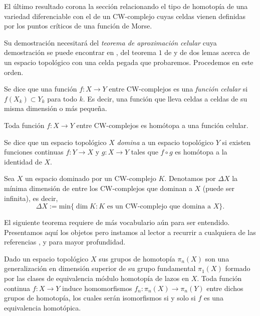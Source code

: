 El último resultado corona la sección relacionando el tipo de homotopía de una variedad diferenciable con el de un CW-complejo cuyas celdas vienen definidas por los puntos críticos de una función de Morse. 

Su demostración necesitará del \textit{teorema de aproximación celular} cuya demostración se puede encontrar en \cite[p.~349]{hatcher2002}, del teorema $1$ de \cite{Whitehead1949CombinatorialHomotopy} y de dos lemas acerca de un espacio topológico con una celda pegada que probaremos. Procedemos en este orden.
\vspace{0.5em}

\begin{definition}
    Se dice que una función $f:X\to Y$ entre CW-complejos es una \textit{función celular} si $f(X_k)\subset Y_k$ para todo $k$. Es decir, una función que lleva celdas a celdas de su misma dimensión o más pequeña.
\end{definition}
\begin{theorem}
\label{aprox_celular}
    Toda función $f:X\to Y$ entre CW-complejos es homótopa a una función celular.
\end{theorem}

\bigskip

\begin{definition}
    Se dice que un espacio topológico $X$ \textit{domina} a un espacio topológico $Y$ si existen funciones continuas $f:Y\to X$ y $g:X\to Y$ tales que $f\circ g$ es homótopa a la identidad de $X$.
\end{definition}

\begin{definition}
    Sea $X$ un espacio dominado por un CW-complejo $K$. Denotamos por $\Delta X$ la mínima dimensión de entre los CW-complejos que dominan a $X$ (puede ser infinita), es decir,
    \begin{equation*}
        \Delta X := \text{min}\{\dim K\colon K \text{ es un CW-complejo que domina a }X\}.
    \end{equation*}
\end{definition}

El siguiente teorema requiere de más vocabulario aún para ser entendido. Presentamos aquí los objetos pero instamos al lector a recurrir a cualquiera de las referencias \cite{Whitehead1949CombinatorialHomotopy}, \cite{munoz2021} y \cite{hatcher2002} para mayor profundidad.

Dado un espacio topológico $X$ sus grupos de homotopía $\pi_n(X)$ son una generalización en dimensión superior de su grupo fundamental $\pi_1(X)$ formado por las clases de equivalencia módulo homotopía de lazos en $X$. Toda función continua $f:X\to Y$ induce homomorfismos $f_n:\pi_n(X)\to \pi_n(Y)$ entre dichos grupos de homotopía, los cuales serán isomorfismos si y solo si $f$ es una equivalencia homotópica.

